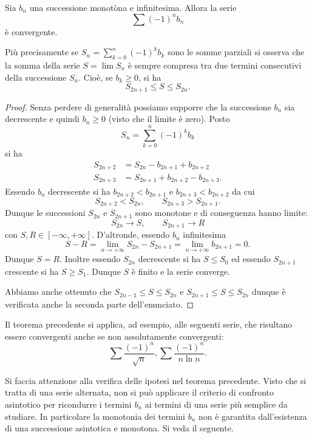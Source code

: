 \begin{theorem}
\label{th:Leibniz}%
\mymark{***}%
%
%
%
%
Sia $b_n$ una successione monotòna e infinitesima. Allora
la serie
\[
  \sum (-1)^{n} b_n
\]
è convergente.

Più precisamente se $\displaystyle S_n = \sum_{k=0}^n (-1)^k b_k$
sono le somme parziali
si osserva che la somma della serie $S= \lim S_n$ è sempre compresa
tra due termini consecutivi della successione $S_n$. 
Cioè, se $b_k\ge 0$, si ha
\[
  S_{2n+1} \le S \le S_{2n}.
\]
\end{theorem}
%
\begin{proof}
\mymark{***}
Senza perdere di generalità possiamo supporre che la successione $b_n$ sia decrescente e quindi $b_n \ge 0$ (visto che il limite è zero).
Posto
\[
 S_n = \sum_{k=0}^n (-1)^k b_k
\]
si ha
\begin{align*}
  S_{2n+2} &= S_{2n} - b_{2n+1} + b_{2n+2} \\
  S_{2n+3} &= S_{2n+1} + b_{2n+2} - b_{2n+3}.
\end{align*}
Essendo $b_n$ decrescente si ha $b_{2n+2} < b_{2n+1}$ e $b_{2n+3} < b_{2n+2}$ da cui
\[
  S_{2n+2} < S_{2n}, \qquad S_{2n+3} > S_{2n+1}.
\]
Dunque le successioni $S_{2n}$ e $S_{2n+1}$ sono monotone e di conseguenza
hanno limite:
\[
  S_{2n} \to S, \qquad S_{2n+1} \to R
\]
con $S, R  \in [-\infty, +\infty]$.
D'altronde, essendo $b_n$ infinitesima
\[
  S - R
  = \lim_{n\to +\infty} S_{2n} - S_{2n+1}
  = \lim_{n\to +\infty} b_{2n+1} = 0.
\]
Dunque $S=R$. Inoltre essendo $S_{2n}$ decrescente si ha
$S \le S_0$ ed essendo $S_{2n+1}$ crescente si ha $S\ge S_1$.
Dunque $S$ è finito e la serie converge.

Abbiamo anche ottenuto che
$S_{2n-1} \le S \le S_{2n}$ e $S_{2n+1} \le S \le S_{2n}$
dunque è verificata anche la seconda parte dell'enunciato.
\end{proof}

Il teorema precedente si applica, ad esempio, alle seguenti serie,
che risultano essere convergenti anche se non assolutamente 
convergenti:
\[
   \sum \frac{(-1)^n}{\sqrt n}, 
   \sum \frac{(-1)^n}{n\ln n}.
\]

Si faccia attenzione alla verifica delle ipotesi nel teorema precedente.
Visto che si tratta di una serie alternata, non si può applicare 
il criterio di confronto asintotico per ricondurre i termini $b_n$ 
ai termini di una serie più semplice da studiare. 
In particolare la monotonia dei termini $b_n$ non è garantita 
dall'esistenza di una successione asintotica e monotona. 
Si veda il seguente.

